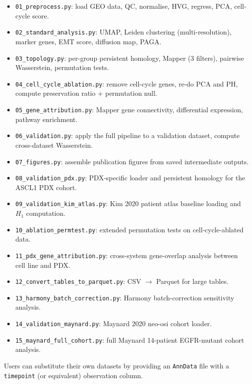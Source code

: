 \documentclass[11pt,a4paper]{article}
\begin{document}
\begin{itemize}[leftmargin=1.25em]
  \item \texttt{01\_preprocess.py}: load GEO data, QC, normalise, HVG,
        regress, PCA, cell-cycle score.
  \item \texttt{02\_standard\_analysis.py}: UMAP, Leiden clustering
        \citep{traag2019} (multi-resolution), marker genes, EMT score,
        diffusion map, PAGA.
  \item \texttt{03\_topology.py}: per-group persistent homology, Mapper
        (3 filters), pairwise Wasserstein, permutation tests.
  \item \texttt{04\_cell\_cycle\_ablation.py}: remove cell-cycle genes,
        re-do PCA and PH, compute preservation ratio + permutation null.
  \item \texttt{05\_gene\_attribution.py}: Mapper gene connectivity,
        differential expression, pathway enrichment.
  \item \texttt{06\_validation.py}: apply the full pipeline to a
        validation dataset, compute cross-dataset Wasserstein.
  \item \texttt{07\_figures.py}: assemble publication figures from
        saved intermediate outputs.
  \item \texttt{08\_validation\_pdx.py}: PDX-specific loader and
        persistent homology for the ASCL1 PDX cohort.
  \item \texttt{09\_validation\_kim\_atlas.py}: Kim 2020 patient atlas
        baseline loading and $H_1$ computation.
  \item \texttt{10\_ablation\_permtest.py}: extended permutation tests
        on cell-cycle-ablated data.
  \item \texttt{11\_pdx\_gene\_attribution.py}: cross-system
        gene-overlap analysis between cell line and PDX.
  \item \texttt{12\_convert\_tables\_to\_parquet.py}: CSV $\to$ Parquet
        for large tables.
  \item \texttt{13\_harmony\_batch\_correction.py}: Harmony
        batch-correction sensitivity analysis.
  \item \texttt{14\_validation\_maynard.py}: Maynard 2020 neo-osi
        cohort loader.
  \item \texttt{15\_maynard\_full\_cohort.py}: full Maynard 14-patient
        EGFR-mutant cohort analysis.
\end{itemize}
Users can substitute their own datasets by providing an
\texttt{AnnData} file with a \texttt{timepoint} (or equivalent)
observation column.
\end{document}

